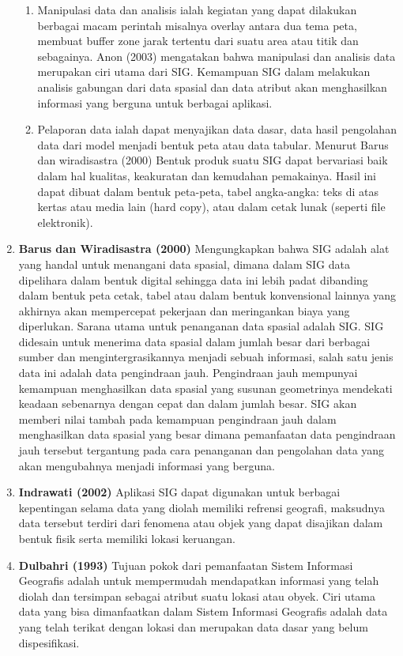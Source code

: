 \begin{enumerate}
\begin{enumerate}
\item Manipulasi data dan analisis ialah kegiatan yang dapat dilakukan berbagai macam perintah misalnya overlay antara dua tema peta, membuat buffer zone jarak tertentu dari suatu area atau titik dan sebagainya. Anon (2003) mengatakan bahwa manipulasi dan analisis data merupakan ciri utama dari SIG. Kemampuan SIG dalam melakukan analisis gabungan dari data spasial dan data atribut akan menghasilkan informasi yang berguna untuk berbagai aplikasi.

\item Pelaporan data ialah dapat menyajikan data dasar, data hasil pengolahan data dari model menjadi bentuk peta atau data tabular. Menurut Barus dan wiradisastra (2000) Bentuk produk suatu SIG dapat bervariasi baik dalam hal kualitas, keakuratan dan kemudahan pemakainya. Hasil ini dapat dibuat dalam bentuk peta-peta, tabel angka-angka: teks di atas kertas atau media lain (hard copy), atau dalam cetak lunak (seperti file elektronik).
\end{enumerate}

\item \textbf{Barus dan Wiradisastra (2000)} 
\subitem Mengungkapkan bahwa SIG adalah alat yang handal untuk menangani data spasial, dimana dalam SIG data dipelihara dalam bentuk digital sehingga data ini lebih padat dibanding dalam bentuk peta cetak, tabel atau dalam bentuk konvensional lainnya yang akhirnya akan mempercepat pekerjaan dan meringankan biaya yang diperlukan.
Sarana utama untuk penanganan data spasial adalah SIG. SIG didesain untuk menerima data spasial dalam jumlah besar dari berbagai sumber dan mengintergrasikannya menjadi sebuah informasi, salah satu jenis data ini adalah data pengindraan jauh. Pengindraan jauh mempunyai kemampuan menghasilkan data spasial yang susunan geometrinya mendekati keadaan sebenarnya dengan cepat dan dalam jumlah besar. 
SIG akan memberi nilai tambah pada kemampuan pengindraan jauh dalam menghasilkan data spasial yang besar dimana pemanfaatan data pengindraan jauh tersebut tergantung pada cara penanganan dan pengolahan data yang akan mengubahnya menjadi informasi yang berguna.

\item \textbf{Indrawati (2002)}
\subitem Aplikasi SIG dapat digunakan untuk berbagai kepentingan selama data yang diolah memiliki refrensi geografi, maksudnya data tersebut terdiri dari fenomena atau objek yang dapat disajikan dalam bentuk fisik serta memiliki lokasi keruangan.

\item \textbf{Dulbahri (1993)}
\subitem Tujuan pokok dari pemanfaatan Sistem Informasi Geografis adalah untuk mempermudah mendapatkan informasi yang telah diolah dan tersimpan sebagai atribut suatu lokasi atau obyek. Ciri utama data yang bisa dimanfaatkan dalam Sistem Informasi Geografis adalah data yang telah terikat dengan lokasi dan merupakan data dasar yang belum dispesifikasi.
\end{enumerate}


